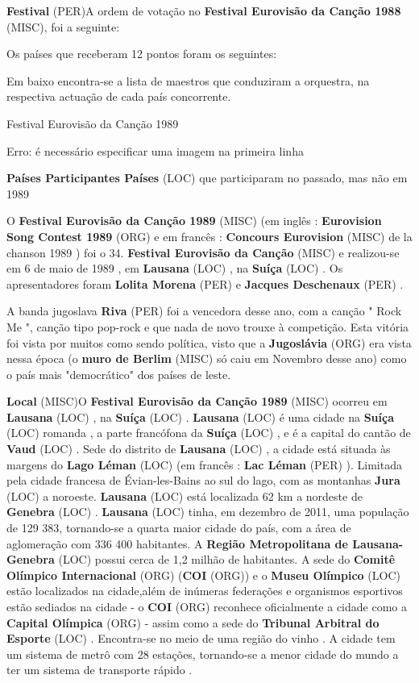 \documentclass[12pt,a4paper]{article}
\begin{document}
\textbf{Festival} (PER)A ordem de votação no \textbf{Festival Eurovisão da Canção 1988} (MISC), foi a seguinte:

Os países que receberam 12 pontos foram os seguintes:

Em baixo encontra-se a lista de maestros que conduziram a orquestra, na respectiva actuação de cada país concorrente.



Festival Eurovisão da Canção 1989



Erro: é necessário especificar uma imagem na primeira linha

\textbf{Países Participantes Países} (LOC) que participaram no passado, mas não em 1989

O \textbf{Festival Eurovisão da Canção 1989} (MISC) (em inglês : \textbf{Eurovision Song Contest 1989} (ORG) e em francês : \textbf{Concours Eurovision} (MISC) de la chanson 1989 ) foi o 34. \textbf{Festival Eurovisão da Canção} (MISC) e realizou-se em 6 de maio de 1989 , em \textbf{Lausana} (LOC) , na \textbf{Suíça} (LOC) . Os apresentadores foram \textbf{Lolita Morena} (PER) e \textbf{Jacques Deschenaux} (PER) .

A banda jugoslava \textbf{Riva} (PER) foi a vencedora desse ano, com a canção " Rock Me ", canção tipo pop-rock e que nada de novo trouxe à competição. Esta vitória foi vista por muitos como sendo política, visto que a \textbf{Jugoslávia} (ORG) era vista nessa época (o \textbf{muro de Berlim} (MISC) só caiu em Novembro desse ano) como o país mais "democrático" dos países de leste.



\textbf{Local} (MISC)O \textbf{Festival Eurovisão da Canção 1989} (MISC) ocorreu em \textbf{Lausana} (LOC) , na \textbf{Suíça} (LOC) . \textbf{Lausana} (LOC) é uma cidade na \textbf{Suíça} (LOC) romanda , a parte francófona da \textbf{Suíça} (LOC) , e é a capital do cantão de \textbf{Vaud} (LOC) . Sede do distrito de \textbf{Lausana} (LOC) , a cidade está situada às margens do \textbf{Lago Léman} (LOC) (em francês : \textbf{Lac Léman} (PER) ). Limitada pela cidade francesa de Évian-les-Bains ao sul do lago, com as montanhas \textbf{Jura} (LOC) a noroeste. \textbf{Lausana} (LOC) está localizada 62 km a nordeste de \textbf{Genebra} (LOC) . \textbf{Lausana} (LOC) tinha, em dezembro de 2011, uma população de 129 383, tornando-se a quarta maior cidade do país, com a área de aglomeração com 336 400 habitantes. A \textbf{Região Metropolitana de Lausana-Genebra} (LOC) possui cerca de 1,2 milhão de habitantes. A sede do \textbf{Comitê Olímpico Internacional} (ORG) (\textbf{COI} (ORG)) e o \textbf{Museu Olímpico} (LOC) estão localizados na cidade,além de inúmeras federações e organismos esportivos estão sediados na cidade - o \textbf{COI} (ORG) reconhece oficialmente a cidade como a \textbf{Capital Olímpica} (ORG) - assim como a sede do \textbf{Tribunal Arbitral do Esporte} (LOC) . Encontra-se no meio de uma região do vinho . A cidade tem um sistema de metrô com 28 estações, tornando-se a menor cidade do mundo a ter um sistema de transporte rápido .
\end{document}
